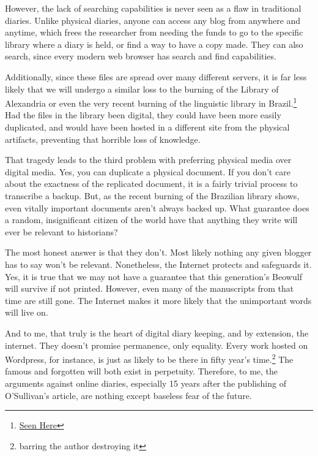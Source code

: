 \documentclass[12pt]{article}[titlepage]
\newcommand{\1}{\={a}}
\newcommand{\2}{\={e}}
\newcommand{\3}{\={\i}}
\newcommand{\4}{\=o}
\newcommand{\5}{\=u}
\newcommand{\6}{\={A}}
\renewcommand{\,}{\textsuperscript{,}}
\begin{document}
However, the lack of searching capabilities is never seen as a flaw in traditional diaries.
Unlike physical diaries, anyone can access any blog from anywhere and anytime, which frees the researcher from needing the funds to go to the specific library where a diary is held, or find a way to have a copy made.
They can also search, since every modern web browser has search and find capabilities.

Additionally, since these files are spread over many different servers, it is far less likely that we will undergo a similar loss to the burning of the Library of Alexandria or even the very recent burning of the linguistic library in Brazil.\footnote{\href{https://www.nationalgeographic.com/science/2018/09/news-museu-nacional-fire-rio-de-janeiro-natural-history/}{Seen Here}}
Had the files in the library been digital, they could have been more easily duplicated, and would have been hosted in a different site from the physical artifacts, preventing that horrible loss of knowledge.

That tragedy leads to the third problem with preferring physical media over digital media.
Yes, you can duplicate a physical document.
If you don’t care about the exactness of the replicated document, it is a fairly trivial process to transcribe a backup.
But, as the recent burning of the Brazilian library shows, even vitally important documents aren’t always backed up.
What guarantee does a random, insignificant citizen of the world have that anything they write will ever be relevant to historians?

The most honest answer is that they don’t.
Most likely nothing any given blogger has to say won’t be relevant.
Nonetheless, the Internet protects and safeguards it.
Yes, it is true that we may not have a guarantee that this generation’s Beowulf will survive if not printed.
However, even many of the manuscripts from that time are still gone.
The Internet makes it more likely that the unimportant words will live on.

And to me, that truly is the heart of digital diary keeping, and by extension, the internet.
They doesn’t promise permanence, only equality.
Every work hosted on Wordpress, for instance, is just as likely to be there in fifty year’s time.\footnote{barring the author destroying it}
The famous and forgotten will both exist in perpetuity.
Therefore, to me, the arguments against online diaries, especially 15 years after the publishing of O’Sullivan’s article, are nothing except baseless fear of the future.
\end{document}
